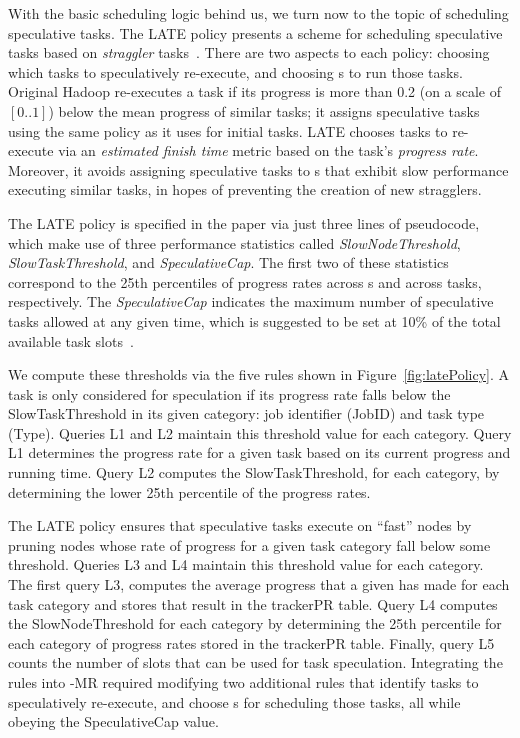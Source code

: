 With the basic scheduling logic behind us, we turn now to the topic of
scheduling speculative tasks. The LATE policy presents a scheme for 
scheduling speculative tasks based on {\em straggler} tasks~\cite{late-sched}.
There are two aspects to each policy:
choosing which tasks to speculatively re-execute, and choosing {\TT}s
to run those tasks.  Original Hadoop re-executes a task if its
progress is more than 0.2 (on a scale of $[0..1]$) below the mean
progress of similar tasks; it assigns speculative tasks using the same
policy as it uses for initial tasks. LATE chooses tasks to re-execute
via an {\em estimated finish time} metric based on the task's
\emph{progress rate}. Moreover, it avoids assigning speculative tasks
to {\TT}s that exhibit slow performance executing similar tasks, in
hopes of preventing the creation of new stragglers.

The LATE policy is specified in the paper via just three lines of pseudocode, which make use of three 
performance statistics called {\em SlowNodeThreshold}, {\em SlowTaskThreshold}, and {\em SpeculativeCap}.  
The first two of these statistics correspond to the 25th percentiles of progress rates across {\TT}s and across tasks, 
respectively.  The {\em SpeculativeCap} indicates the maximum number of speculative tasks allowed at any given 
time, which is suggested to be set at 10\% of the total available task slots~\cite{late-sched}.  

We compute these thresholds via the five \OVERLOG rules shown in
Figure~\ref{fig:latePolicy}. A task is only considered for speculation if its progress rate falls 
below the SlowTaskThreshold in its given category: job identifier (JobID) and task type (Type).  
Queries L1 and L2 maintain this threshold value for each category. Query L1 determines the progress 
rate for a given task based on its current progress and running time. Query L2 computes the SlowTaskThreshold, 
for each category, by determining the lower 25th percentile of the progress rates. 

The LATE policy ensures that speculative tasks execute on ``fast'' nodes by pruning \TT 
nodes whose rate of progress for a given task category fall below some threshold. 
Queries L3 and L4 maintain this threshold value for each category. The first query L3, computes 
the average progress that a given \TT has made for each task category and stores that result in 
the trackerPR table. Query L4 computes the SlowNodeThreshold for each category by determining the 25th 
percentile for each category of progress rates stored in the trackerPR table. Finally, query L5 counts the number of
slots that can be used for task speculation. Integrating the rules into \BOOM-MR required modifying two 
additional \OVERLOG rules that identify tasks to speculatively re-execute, and choose {\TT}s for scheduling those
tasks, all while obeying the SpeculativeCap value.

